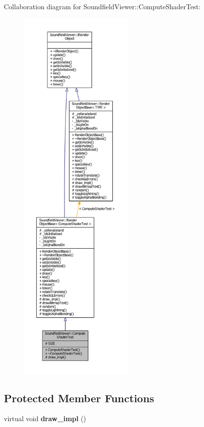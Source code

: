 Collaboration diagram for Soundfield\-Viewer\-:\-:Compute\-Shader\-Test\-:\nopagebreak
\begin{figure}[H]
\begin{center}
\leavevmode
\includegraphics[height=550pt]{d0/d4e/classSoundfieldViewer_1_1ComputeShaderTest__coll__graph}
\end{center}
\end{figure}
\subsection*{Protected Member Functions}
\begin{DoxyCompactItemize}
\item 
virtual void {\bfseries draw\-\_\-impl} ()\label{classSoundfieldViewer_1_1ComputeShaderTest_a77367561c0625f58505b6f91e12bed0e}

\end{DoxyCompactItemize}
